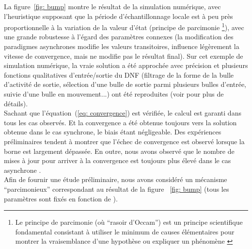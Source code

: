 La figure~\ref{fig: bump} montre le résultat de la simulation numérique, avec l'heuristique supposant que la période d'échantillonnage locale est à peu près proportionnelle à la variation de la valeur d'état (principe de parcimonie \footnote{ Le principe de parcimonie (o\`u ``rasoir d'Occam'') est un principe scientifique fondamental consistant à utiliser le minimum de causes élémentaires pour montrer la vraisemblance d'une hypothèse ou expliquer un phénomène \cite{Fernandez:2010}}), avec une grande robustesse à l'égard des paramètres connexes (la modification des paradigmes asynchrones modifie les valeurs transitoires, influence légèrement la vitesse de convergence, mais ne modifie pas le résultat final). Sur ​​cet exemple de simulation numérique, la vraie solution a été approchée avec précision et plusieurs fonctions qualitatives d'entrée/sortie du DNF (filtrage de la forme de la bulle d'activité de sortie, sélection d'une bulle de sortie parmi plusieurs bulles d'entrée, suivie d'une bulle en mouvement...) ont été reproduites (voir \cite {Alexandre:2009} pour plus de détails). \\

Sachant que l'équation~(\ref{eq: convergence}) est vérifiée, le calcul est garanti dans tous les cas observés. Et la convergence a été obtenue toujours vers la solution obtenue dans le cas synchrone, le biais étant négligeable. Des expériences préliminaires tendent à montrer que l'échec de convergence est observé lorsque la borne est largement dépassée. En outre, nous avons observé que le nombre de mises à jour pour arriver à la convergence est toujours plus élevé dans le cas asynchrone .\\

Afin de fournir une étude préliminaire, nous avons considéré un mécanisme ``parcimonieux'' correspondant au résultat de la figure ~\ref{fig: bump} (tous les paramètres sont fixés en fonction de \cite{Alexandre:2009}).\\

